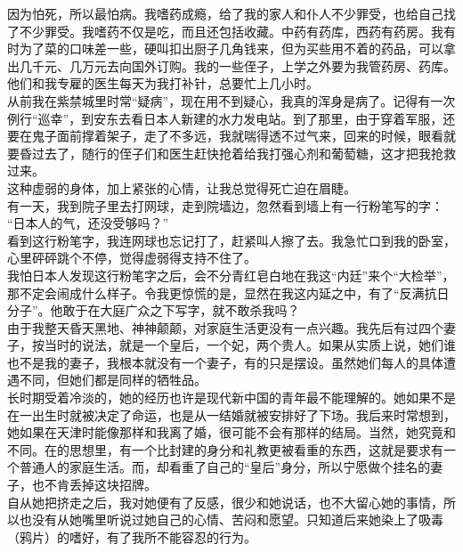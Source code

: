 因为怕死，所以最怕病。我嗜药成瘾，给了我的家人和仆人不少罪受，也给自己找了不少罪受。我嗜药不仅是吃，而且还包括收藏。中药有药库，西药有药房。我有时为了菜的口味差一些，硬叫扣出厨子几角钱来，但为买些用不着的药品，可以拿出几千元、几万元去向国外订购。我的一些侄子，上学之外要为我管药房、药库。他们和我专雇的医生每天为我打补针，总要忙上几小时。\\

从前我在紫禁城里时常“疑病”，现在用不到疑心，我真的浑身是病了。记得有一次例行“巡幸”，到安东去看日本人新建的水力发电站。到了那里，由于穿着军服，还要在鬼子面前撑着架子，走了不多远，我就喘得透不过气来，回来的时候，眼看就要昏过去了，随行的侄子们和医生赶快抢着给我打强心剂和葡萄糖，这才把我抢救过来。\\

这种虚弱的身体，加上紧张的心情，让我总觉得死亡迫在眉睫。\\

有一天，我到院子里去打网球，走到院墙边，忽然看到墙上有一行粉笔写的字：\\

“日本人的气，还没受够吗？”\\

看到这行粉笔字，我连网球也忘记打了，赶紧叫人擦了去。我急忙口到我的卧室，心里砰砰跳个不停，觉得虚弱得支持不住了。\\

我怕日本人发现这行粉笔字之后，会不分青红皂白地在我这“内廷”来个“大检举”，那不定会闹成什么样子。令我更惊慌的是，显然在我这内延之中，有了“反满抗日分子”。他敢于在大庭广众之下写字，就不敢杀我吗？\\

由于我整天昏天黑地、神神颠颠，对家庭生活更没有一点兴趣。我先后有过四个妻子，按当时的说法，就是一个皇后，一个妃，两个贵人。如果从实质上说，她们谁也不是我的妻子，我根本就没有一个妻子，有的只是摆设。虽然她们每人的具体遭遇不同，但她们都是同样的牺牲品。\\

长时期受着冷淡的，她的经历也许是现代新中国的青年最不能理解的。她如果不是在一出生时就被决定了命运，也是从一结婚就被安排好了下场。我后来时常想到，她如果在天津时能像那样和我离了婚，很可能不会有那样的结局。当然，她究竟和不同。在的思想里，有一个比封建的身分和礼教更被看重的东西，这就是要求有一个普通人的家庭生活。而，却看重了自己的“皇后”身分，所以宁愿做个挂名的妻子，也不肯丢掉这块招牌。\\

自从她把挤走之后，我对她便有了反感，很少和她说话，也不大留心她的事情，所以也没有从她嘴里听说过她自己的心情、苦闷和愿望。只知道后来她染上了吸毒（鸦片）的嗜好，有了我所不能容忍的行为。\\

